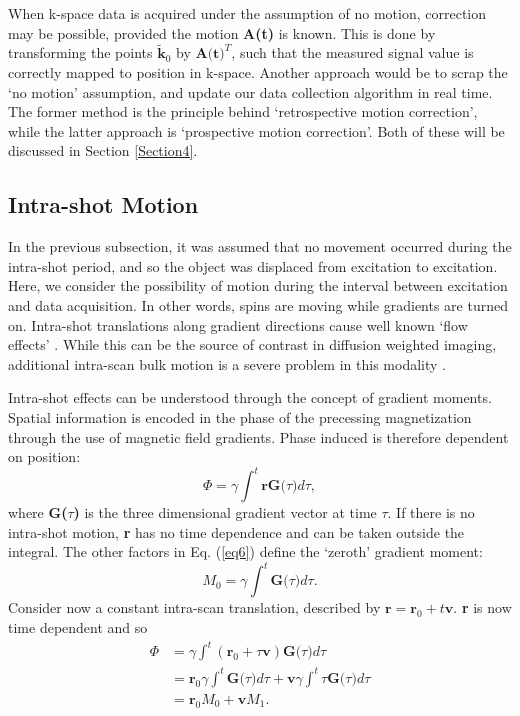 \documentclass[class=article, crop=false]{standalone}
\begin{document}
\par
When k-space data is acquired under the assumption of no motion, correction may be possible, provided the motion \textbf{A(t)} is known. This is done by transforming the points $\tilde{\textbf{k}}_0$ by $\textbf{A(t)}^T$, such that the measured signal value is correctly mapped to position in k-space. Another approach would be to scrap the `no motion' assumption, and update our data collection algorithm in real time. The former method is the principle behind `retrospective motion correction', while the latter approach is `prospective motion correction'. Both of these will be discussed in Section \ref{Section4}.

\subsection{Intra-shot Motion}
In the previous subsection, it was assumed that no movement occurred during the intra-shot period, and so the object was displaced from excitation to excitation. Here, we consider the possibility of motion during the interval between excitation and data acquisition. In other words, spins are moving while gradients are turned on. Intra-shot translations along gradient directions cause well known `flow effects' \parencite{Barth1985}. While this can be the source of contrast in diffusion weighted imaging, additional intra-scan bulk motion is a severe problem in this modality \parencite{LeBihan2006}.
\par
Intra-shot effects can be understood through the concept of gradient moments. Spatial information is encoded in the phase of the precessing magnetization through the use of magnetic field gradients. Phase induced is therefore dependent on position:
\begin{equation} \label{eq6}
	\Phi = \gamma\int^{t}\textbf{r}\textbf{G($\tau$)}d\tau,
\end{equation}
where \textbf{G($\tau$)} is the three dimensional gradient vector at time $\tau$. If there is no intra-shot motion, \textbf{r} has no time dependence and can be taken outside the integral. The other factors in Eq. (\ref{eq6}) define the `zeroth' gradient moment:
\begin{equation} \label{eq7}
	M_0 = \gamma\int^{t}\textbf{G($\tau$)}d\tau.
\end{equation}
Consider now a constant intra-scan translation, described by $\textbf{r} = \textbf{r}_0 + t\textbf{v}$. \textbf{r} is now time dependent and so
\begin{equation} \label{eq8}
	\begin{split}
		\Phi & = \gamma\int^t(\textbf{r}_0 + \tau\textbf{v})\textbf{G($\tau$)}d\tau \\
			 & = \textbf{r}_0\gamma\int^t\textbf{G($\tau$)}d\tau + \textbf{v}\gamma\int^t\tau\textbf{G($\tau$)}d\tau \\
			 & = \textbf{r}_0M_0 + \textbf{v}M_1.
	\end{split}
\end{equation}
\end{document}
